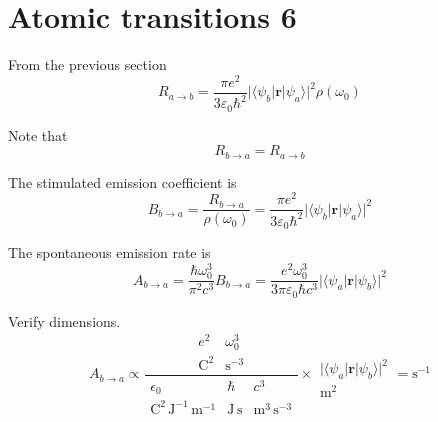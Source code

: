 

\section*{Atomic transitions 6}

From the previous section
\begin{equation*}
R_{a\rightarrow b}
=\frac{\pi e^2}{3\varepsilon_0\hbar^2}
\bigl|\langle\psi_b|\mathbf r|\psi_a\rangle\bigr|^2\rho(\omega_0)
\end{equation*}

Note that
\begin{equation*}
R_{b\rightarrow a}=R_{a\rightarrow b}
\end{equation*}

The stimulated emission coefficient is
\begin{equation*}
B_{b\rightarrow a}=\frac{R_{b\rightarrow a}}{\rho(\omega_0)}
=\frac{\pi e^2}{3\varepsilon_0\hbar^2}
\bigl|\langle\psi_b|\mathbf r|\psi_a\rangle\bigr|^2
\end{equation*}

The spontaneous emission rate is
\begin{equation*}
A_{b\rightarrow a}=\frac{\hbar\omega_0^3}{\pi^2c^3}B_{b\rightarrow a}
=\frac{e^2\omega_0^3}{3\pi\varepsilon_0\hbar c^3}
\bigl|\langle\psi_a|\mathbf r|\psi_b\rangle\bigr|^2
\tag{1}
\end{equation*}

Verify dimensions.
\begin{equation*}
A_{b\rightarrow a}\propto
\frac{
\begin{matrix}
e^2 & \omega_0^3
\\
\text{C}^2 & \text{s}^{-3}
\end{matrix}
}
{
\begin{matrix}
\epsilon_0 & \hbar & c^3
\\
\text{C}^2\,\text{J}^{-1}\,\text{m}^{-1}
& \text{J}\,\text{s}
& \text{m}^3\,\text{s}^{-3}
\end{matrix}
}
\times
\begin{matrix}
\\
\bigl|\langle\psi_a|\mathbf r|\psi_b\rangle\bigr|^2
\\
\text{m}^2
\end{matrix}
=\text{s}^{-1}
\end{equation*}


